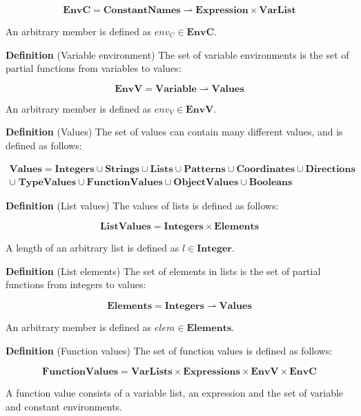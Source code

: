 \[
  \mathbf{EnvC} = \mathbf{ConstantNames} \rightharpoonup \mathbf{Expression}
  \times \mathbf{VarList}
\]

An arbitrary member is defined as $env_{C} \in \mathbf{EnvC}$.

\textbf{Definition} (Variable environment) \hspace{0.5cm} The set of variable environments is the set
of partial functions from variables to values:

\[
  \mathbf{EnvV} = \mathbf{Variable} \rightharpoonup \mathbf{Values}
\]


An arbitrary member is defined as $env_{V} \in \mathbf{EnvV}$.

\textbf{Definition} (Values) \hspace{0.5cm} The set of values can contain many
different values, and is defined as follows:

\begin{align*}
 \mathbf{Values} = \mathbf{Integers} \cup \mathbf{Strings} \cup \mathbf{Lists}
 \cup \mathbf{Patterns} \cup \mathbf{Coordinates} \cup \mathbf{Directions}\\ 
 \cup\; \mathbf{TypeValues} \cup \mathbf{FunctionValues} \cup \mathbf{ObjectValues} 
 \cup \mathbf{Booleans}
\end{align*}

\textbf{Definition} (List values) \hspace{0.5cm} The values of lists is
defined as follows:

\[
  \mathbf{ListValues} = \mathbf{Integers} \times \mathbf{Elements}
\]

A length of an arbitrary list is defined as $l \in \mathbf{Integer}$.

\textbf{Definition} (List elements) \hspace{0.5cm} The set of elements in
lists is the set of partial functions from integers to values:

\[
  \mathbf{Elements} = \mathbf{Integers} \rightharpoonup \mathbf{Values}
\]

An arbitrary member is defined as $elem \in \mathbf{Elements}$.

\textbf{Definition} (Function values) \hspace{0.5cm} The set of function values
is defined as follows:
 
\[
  \mathbf{FunctionValues} = \mathbf{VarLists} \times \mathbf{Expressions} \times
  \mathbf{EnvV} \times \mathbf{EnvC}
\]

A function value consists of a variable list, an expression and the set of variable
and constant environments.

